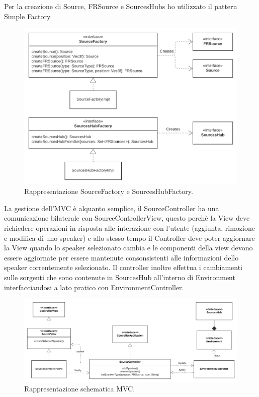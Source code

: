 \documentclass[a4paper,12pt]{report}
\begin{document}
Per la creazione di Source, FRSource e SourcesHubs ho utilizzato il  pattern Simple Factory 
%
\begin{figure}[H]
\centering{}
\includegraphics[width=\textwidth]{img/source/Factory.png}
\caption{Rappresentazione SourceFactory e SourcesHubFactory.}
\label{img:factory}
\end{figure}

La gestione dell'MVC è alquanto semplice, il SourceController ha una comunicazione bilaterale con SourceControllerView, questo perchè la View deve richiedere operazioni in risposta alle interazione con l'utente (aggiunta, rimozione e modifica di uno speaker) e allo stesso tempo il Controller deve poter aggiornare la View quando lo speaker selezionato cambia e le componenti della view devono essere aggiornate per essere mantenute consonsistenti alle informazioni dello speaker correntemente selezionato.
Il controller inoltre effettua i cambiamenti sulle sorgenti che sono contenute in SourcesHub all'interno di Environment interfacciandosi a lato pratico con EnvironmentController.
%
\begin{figure}[H]
\centering{}
\includegraphics[width=\textwidth]{img/source/SourcesMVC.png}
\caption{Rappresentazione schematica MVC.}
\label{img:sourcesMVC}
\end{figure}
\end{document}

